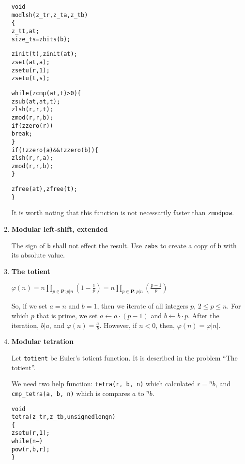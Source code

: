 \begin{enumerate}[label=\textbf{\arabic*}.]
\vspace{-1em}
\begin{alltt}
void
modlsh(z_t r, z_t a, z_t b)
\{
    z_t t, at;
    size_t s = zbits(b);

    zinit(t), zinit(at);
    zset(at, a);
    zsetu(r, 1);
    zsetu(t, s);

    while (zcmp(at, t) > 0) \{
        zsub(at, at, t);
        zlsh(r, r, t);
        zmod(r, r, b);
        if (zzero(r))
            break;
    \}
    if (!zzero(a) && !zzero(b)) \{
        zlsh(r, r, a);
        zmod(r, r, b);
    \}

    zfree(at), zfree(t);
\}
\end{alltt}
\vspace{-1em}

It is worth noting that this function is
not necessarily faster than \texttt{zmodpow}.



\item \textbf{Modular left-shift, extended}

The sign of \texttt{b} shall not effect the
result. Use \texttt{zabs} to create a copy
of \texttt{b} with its absolute value.



\item \textbf{The totient}

\( \displaystyle{
    \varphi(n)
    = n \prod_{p \in \textbf{P} : p | n} \left ( 1 - \frac{1}{p} \right )
    = n \prod_{p \in \textbf{P} : p | n} \left ( \frac{p - 1}{p} \right )
}\)

\noindent
So, if we set $a = n$ and $b = 1$, then we iterate
of all integers $p$, $2 \le p \le n$. For which $p$
that is prime, we set $a \gets a \cdot (p - 1)$ and
$b \gets b \cdot p$. After the iteration, $b | a$,
and $\varphi(n) = \frac{a}{b}$. However, if $n < 0$,
then, $\varphi(n) = \varphi|n|$.



\item \textbf{Modular tetration}

Let \texttt{totient} be Euler's totient function.
It is described in the problem ``The totient''.

We need two help function: \texttt{tetra(r, b, n)}
which calculated $r = {}^n{}b$, and \texttt{cmp\_tetra(a, b, n)}
which is compares $a$ to ${}^n{}b$.

\vspace{-1em}
\begin{alltt}
void
tetra(z_t r, z_t b, unsigned long n)
\{
    zsetu(r, 1);
    while (n--)
        pow(r, b, r);
\}
\end{alltt}
\vspace{-1em}


\end{enumerate}

